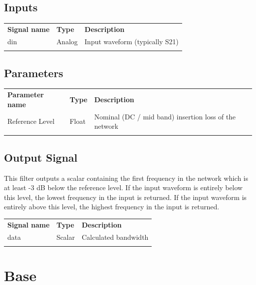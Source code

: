 \subsection{Inputs}

\begin{tabularx}{16cm}{llX}
\thickhline
\textbf{Signal name} & \textbf{Type} & \textbf{Description} \\
\thickhline
din & Analog & Input waveform (typically S21) \\
\thickhline
\end{tabularx}

\subsection{Parameters}

\begin{tabularx}{16cm}{llX}
\thickhline
\textbf{Parameter name} & \textbf{Type} & \textbf{Description} \\
\thickhline
Reference Level & Float & Nominal (DC / mid band) insertion loss of the network\\
\thickhline
\end{tabularx}

\subsection{Output Signal}

This filter outputs a scalar containing the first frequency in the network which is at least -3 dB below the reference
level. If the input waveform is entirely below this level, the lowest frequency in the input is returned. If the
input waveform is entirely above this level, the highest frequency in the input is returned.

\begin{tabularx}{16cm}{llX}
\thickhline
\textbf{Signal name} & \textbf{Type} & \textbf{Description} \\
\thickhline
data & Scalar & Calculated bandwidth \\
\thickhline
\end{tabularx}

\pagebreak
\section{Base}
\label{filter:base}

